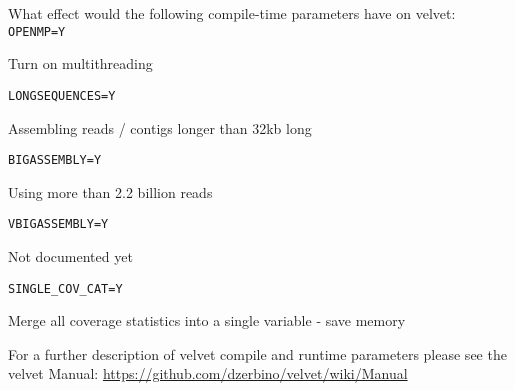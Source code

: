 \begin{questions}
What effect would the following compile-time parameters have on velvet:\\
\texttt{OPENMP=Y}
\begin{answer}
Turn on multithreading
\end{answer}

\texttt{LONGSEQUENCES=Y}
\begin{answer}
Assembling reads / contigs longer than 32kb long
\end{answer}

\texttt{BIGASSEMBLY=Y}
\begin{answer}
Using more than 2.2 billion reads
\end{answer}

\texttt{VBIGASSEMBLY=Y}
\begin{answer}
Not documented yet
\end{answer}

\texttt{SINGLE\_COV\_CAT=Y}
\begin{answer}
Merge all coverage statistics into a single variable - save memory
\end{answer}

\end{questions}

\begin{note}
For a further description of velvet compile and runtime parameters please see
the velvet Manual: \url{https://github.com/dzerbino/velvet/wiki/Manual}
\end{note}

\newpage




%

%

\begin{advanced}

\end{advanced}

